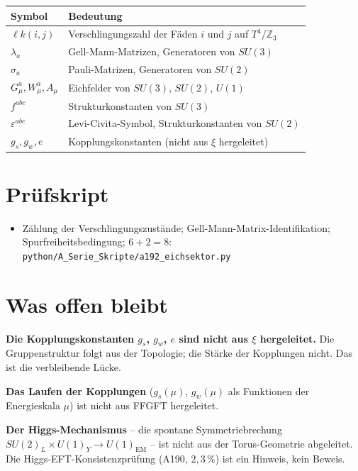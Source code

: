 \begin{center}
\renewcommand{\arraystretch}{1.3}
{\small\begin{tabular}{lp{9cm}}
\toprule
Symbol & Bedeutung \\
\midrule
$\ell k(i,j)$ & Verschlingungszahl der Fäden $i$ und $j$ auf $T^4/\mathbb{Z}_3$ \\
$\lambda_a$ & Gell-Mann-Matrizen, Generatoren von $SU(3)$ \\
$\sigma_a$ & Pauli-Matrizen, Generatoren von $SU(2)$ \\
$G_\mu^a, W_\mu^a, A_\mu$ & Eichfelder von $SU(3)$, $SU(2)$, $U(1)$ \\
$f^{abc}$ & Strukturkonstanten von $SU(3)$ \\
$\varepsilon^{abc}$ & Levi-Civita-Symbol, Strukturkonstanten von $SU(2)$ \\
$g_s, g_w, e$ & Kopplungskonstanten (nicht aus $\xi$ hergeleitet) \\
\bottomrule
\end{tabular}}
\renewcommand{\arraystretch}{1.0}
\end{center}

\section{Prüfskript}

\begin{itemize}[leftmargin=2em,itemsep=2pt,topsep=2pt]
  \item Zählung der Verschlingungszustände; Gell-Mann-Matrix-Identifikation;
    Spurfreiheitsbedingung; $6+2=8$:
    \texttt{python/A\_Serie\_Skripte/a192\_eichsektor.py}
\end{itemize}

\section{Was offen bleibt}

\textbf{Die Kopplungskonstanten $g_s$, $g_w$, $e$ sind nicht aus $\xi$
hergeleitet.} Die Gruppenstruktur folgt aus der Topologie; die Stärke
der Kopplungen nicht. Das ist die verbleibende Lücke.

\textbf{Das Laufen der Kopplungen} ($g_s(\mu)$, $g_w(\mu)$ als Funktionen
der Energieskala $\mu$) ist nicht aus FFGFT hergeleitet.

\textbf{Der Higgs-Mechanismus} -- die spontane Symmetriebrechung
$SU(2)_L\times U(1)_Y\to U(1)_\text{EM}$ -- ist nicht aus der
Torus-Geometrie abgeleitet. Die Higgs-EFT-Konsistenzprüfung (A190,
$2{,}3\,\%$) ist ein Hinweis, kein Beweis.

